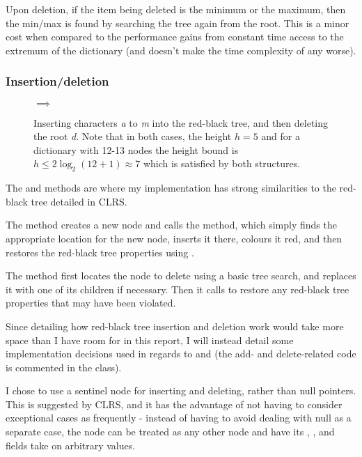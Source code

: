Upon deletion, if the item being deleted is the minimum or the maximum, then the min/max is found by searching the tree again from the root. This is a minor cost when compared to the performance gains from constant time access to the extremum of the dictionary (and doesn't make the time complexity of  any worse).

\subsubsection{Insertion/deletion} 

\begin{figure}[b]
\centering
{}
$\implies$
\caption{Inserting characters \textit{a} to \textit{m} into the red-black tree, and then deleting the root \textit{d}. Note that in both cases, the height $h = 5$ and for a dictionary with 12-13 nodes the height bound is $h \leq 2\log_2(12+1) \approx 7$ which is satisfied by both structures.}
\end{figure}

The  and  methods are where my implementation has strong similarities to the red-black tree detailed in CLRS.

The  method creates a new node and calls the  method, which simply finds the appropriate location for the new node, inserts it there, colours it red, and then restores the red-black tree properties using .

The  method first locates the node to delete using a basic tree search, and replaces it with one of its children if necessary. Then it calls  to restore any red-black tree properties that may have been violated.

Since detailing how red-black tree insertion and deletion work would take more space than I have room for in this report, I will instead detail some implementation decisions used in regards to  and  (the add- and delete-related code is commented in the  class).

I chose to use a sentinel node  for inserting and deleting, rather than null pointers. This is suggested by CLRS, and it has the advantage of not having to consider exceptional cases as frequently - instead of having to avoid dealing with null as a separate case, the  node can be treated as any other node and have its , , and  fields take on arbitrary values.

